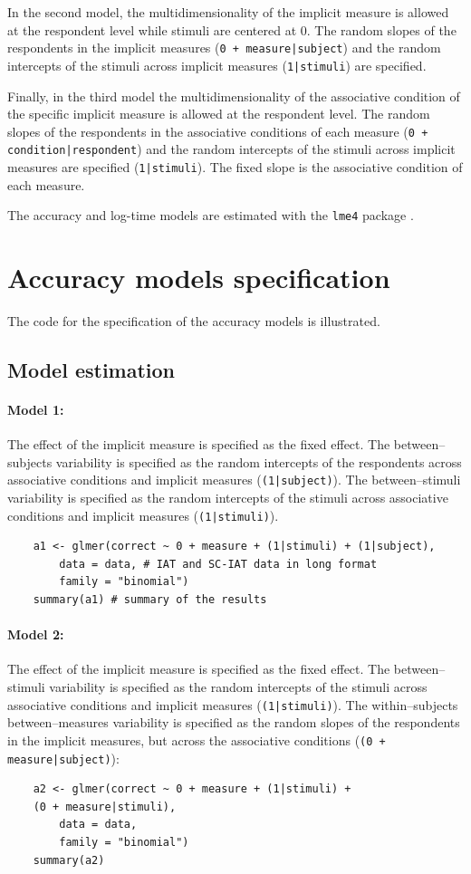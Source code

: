 \documentclass[12pt]{book}
\begin{document}
In the second model, the multidimensionality of the implicit measure is allowed at the respondent level while stimuli are centered at 0. 
The random slopes of the respondents in the implicit measures (\texttt{0 + measure|subject}) and the random intercepts of the stimuli across implicit measures (\texttt{1|stimuli}) are specified.

Finally, in the third model the multidimensionality of the associative condition of the specific implicit measure is allowed at the respondent level. The random slopes of the respondents in the associative conditions of each measure  (\texttt{0 + condition|respondent}) and the random intercepts of the stimuli across implicit measures are specified (\texttt{1|stimuli}). The fixed slope is the associative condition of each measure.

The accuracy and log-time models are estimated with the \texttt{lme4} package \cite{lme4}.

\section{Accuracy models specification}

The code for the specification of the accuracy models is illustrated. 

\subsection{Model estimation}

\paragraph*{Model 1:} 
The effect of the implicit measure is specified as the fixed effect.
The between--subjects variability is specified as the random intercepts of the respondents across associative conditions and implicit measures (\texttt{(1|subject)}). 
The between--stimuli variability is specified as the random intercepts of the stimuli across associative conditions and implicit measures (\texttt{(1|stimuli)}).
%
\begin{lstlisting}
	a1 <- glmer(correct ~ 0 + measure + (1|stimuli) + (1|subject), 
		data = data, # IAT and SC-IAT data in long format
		family = "binomial")
	summary(a1) # summary of the results  
\end{lstlisting}

\paragraph*{Model 2:} The effect of the implicit measure is specified as the fixed effect.
The between--stimuli variability is specified as the random intercepts of the stimuli across associative conditions and implicit measures (\texttt{(1|stimuli)}). 
The within--subjects between--measures variability is specified as the random slopes of the respondents in the implicit measures, but across the associative conditions (\texttt{(0 + measure|subject)}):
%
\begin{lstlisting}
	a2 <- glmer(correct ~ 0 + measure + (1|stimuli) + 
	(0 + measure|stimuli), 
		data = data, 
		family = "binomial")
	summary(a2) 
\end{lstlisting}
\end{document}
